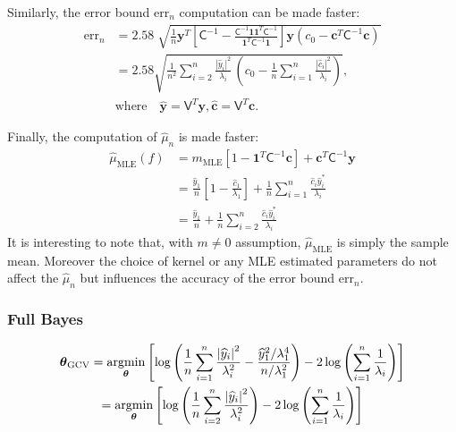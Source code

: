 \documentclass[twocolumn]{svjour3}          %
\newcommand{\bm}[1]{\boldsymbol{#1}}
\newcommand{\trace}[1]{\textup{trace}{#1}}
\newcommand{\vtheta}{{\bm{\theta}}}
\newcommand{\vc}{\bm{c}}
\newcommand{\vy}{\bm{y}}
\newcommand{\vone}{\bm{1}}
\newcommand{\mC}{\mathsf{C}}
\newcommand{\mCInv}{{\mathsf{C}^{-1}}}
\newcommand{\mV}{\mathsf{V}}
\newcommand{\hmu}{\hat{\mu}}
\newcommand{\MLE}{\text{MLE}}
\newcommand{\errn}{\text{err}_{n}}
\def\abs#1{\ensuremath{\left \lvert #1 \right \rvert}}
\providecommand{\argmin}{\operatorname*{argmin}}
\begin{document}
Similarly, the error bound {$\errn$} computation can be made faster:
\begin{align*}
\errn &=
2.58 \; \sqrt{ 
\frac{1}{n}
\vy^T 
\left[ 
\mCInv - 
\frac{ \mCInv \vone \vone^T \mCInv }{\vone^T\mCInv \vone}
\right] \vy
(c_0 - \vc^T\mC^{-1}\vc) } 
\\
&
=
{{
\displaystyle
{
2.58\sqrt{
\frac {1}{n^2} \sum_{i=2}^{n} \frac{\abs{\widehat{y}_i}^2}{\lambda_i}  
\,
\left( c_0 - \frac 1n \sum_{i=1}^n \frac{\abs{\widehat{c}_i}^2}{\lambda_i} \right) 
}
}
}}, 
\\
\nonumber
& \text{where} \quad 
\widehat{\vy} = \mV^T \vy,  
\widehat{\vc} = \mV^T \vc. 
\end{align*}




Finally, the computation of $\hmu_n$ is made faster:
\begin{align}
\nonumber
\hmu_\MLE(f) &= m_\MLE[1 - \vone^T  \mC^{-1}\vc ]
+
\vc^T \mC^{-1} \vy
\\
\nonumber
&= \frac{\widehat{y}_1}{n} \left[1 - \frac{\widehat{c}_1}{\lambda_1}\right]
+ \frac 1n \sum_{i=1}^n \frac{ \widehat{c}_i \widehat{y}_i^*}{\lambda_i}
\\
\label{eqn:hmu_complicated}
& =
 \frac{\widehat{y}_1}{n} +
 \frac 1n \sum_{i=2}^n \frac{ \widehat{c}_i \widehat{y}_i^*}{\lambda_i}
\end{align}
It is interesting to note that, with $m \neq 0$ assumption, $\hmu_\MLE$ is simply the sample mean. 
Moreover the choice of kernel or any MLE estimated parameters do not affect the $\hmu_n$ but influences the accuracy of the error bound $\errn$.

\subsubsection{Full Bayes}


\begin{gather}
\nonumber
\vtheta_{\textup{GCV}} 
= \argmin_\vtheta \left[ \log \left ( \frac 1n \sum_{i=1}^n \frac{\abs{\widehat{y}_i}^2}{\lambda_i^2} - 
\frac{\widehat{y}_1^2/\lambda_1^4}{n/\lambda^2_1}
\right) -2\log\left( \sum_{i=1}^n \frac{1}{\lambda_i} \right)
\right]
\\
= \argmin_\vtheta \left[ \log \left ( \frac 1n \sum_{i=2}^n \frac{\abs{\widehat{y}_i}^2}{\lambda_i^2} 
\right) -2\log\left( \sum_{i=1}^n \frac{1}{\lambda_i} \right)
\right]
\end{gather}
\end{document}
